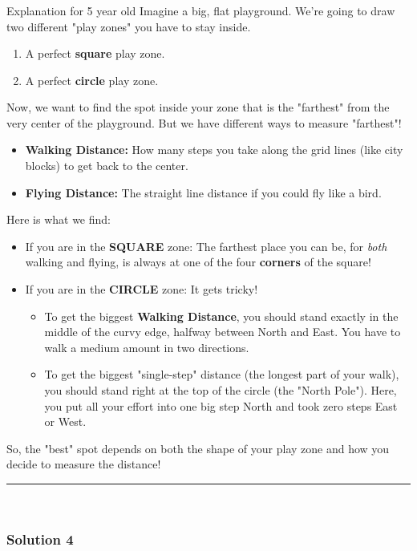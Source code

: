 \documentclass{article}
\begin{document}
\subsubsection*{\normalfont}{Explanation for 5 year old}
Imagine a big, flat playground. We're going to draw two different "play zones" you have to stay inside.
\begin{enumerate}
    \item A perfect \textbf{square} play zone.
    \item A perfect \textbf{circle} play zone.
\end{enumerate}
Now, we want to find the spot inside your zone that is the "farthest" from the very center of the playground. But we have different ways to measure "farthest"!
\begin{itemize}
    \item \textbf{Walking Distance:} How many steps you take along the grid lines (like city blocks) to get back to the center.
    \item \textbf{Flying Distance:} The straight line distance if you could fly like a bird.
\end{itemize}
Here is what we find:
\begin{itemize}
    \item If you are in the \textbf{SQUARE} zone: The farthest place you can be, for \textit{both} walking and flying, is always at one of the four \textbf{corners} of the square!
    \item If you are in the \textbf{CIRCLE} zone: It gets tricky!
    \begin{itemize}
        \item To get the biggest \textbf{Walking Distance}, you should stand exactly in the middle of the curvy edge, halfway between North and East. You have to walk a medium amount in two directions.
        \item To get the biggest "single-step" distance (the longest part of your walk), you should stand right at the top of the circle (the "North Pole"). Here, you put all your effort into one big step North and took zero steps East or West.
    \end{itemize}
\end{itemize}
So, the "best" spot depends on both the shape of your play zone and how you decide to measure the distance!

\noindent\rule{\textwidth}{0.4pt}\\

\newpage

\subsubsection*{Solution 4}
\end{document}
